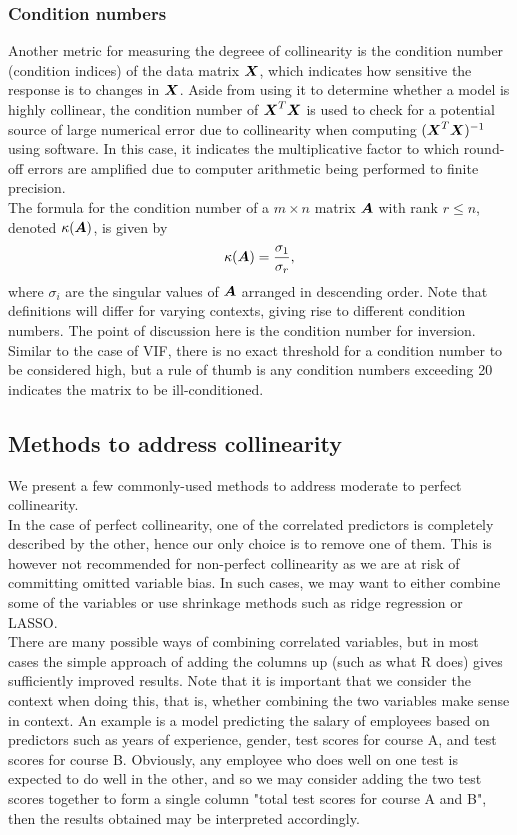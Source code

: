 \documentclass[12pt]{article}
\begin{document}
	\subsubsection{Condition numbers}
	Another metric for measuring the degreee of collinearity is the condition number (condition indices) of the data matrix $\boldsymbol{X}$, which indicates how sensitive the response is to changes in $\boldsymbol{X}$. Aside from using it to determine whether a model is highly collinear, the condition number of $\boldsymbol{X}^T\boldsymbol{X}$ is used to check for a potential source of large numerical error due to collinearity when computing $(\boldsymbol{X}^T\boldsymbol{X})^{-1}$ using software. In this case, it indicates the multiplicative factor to which round-off errors are amplified due to computer arithmetic being performed to finite precision.\\
	
	The formula for the condition number of a $m\times n$ matrix $\boldsymbol{A}$ with rank $r\leq n$, denoted $\kappa(\boldsymbol{A})$, is given by
	$$\kappa(\boldsymbol{A})=\frac{\sigma_1}{\sigma_r},$$
	where $\sigma_i$ are the singular values of $\boldsymbol{A}$ arranged in descending order. Note that definitions will differ for varying contexts, giving rise to different condition numbers. The point of discussion here is the condition number for inversion.\\
	
	Similar to the case of VIF, there is no exact threshold for a condition number to be considered high, but a rule of thumb is any condition numbers exceeding 20 indicates the matrix to be ill-conditioned. 
	
	\subsection{Methods to address collinearity}
	
	We present a few commonly-used methods to address moderate to perfect collinearity. \\
	
	In the case of perfect collinearity, one of the correlated predictors is completely described by the other, hence our only choice is to remove one of them. This is however not recommended for non-perfect collinearity as we are at risk of committing omitted variable bias. In such cases, we may want to either combine some of the variables or use shrinkage methods such as ridge regression or LASSO.\\
	
	There are many possible ways of combining correlated variables, but in most cases the simple approach of adding the columns up (such as what R does) gives sufficiently improved results. Note that it is important that we consider the context when doing this, that is, whether combining the two variables make sense in context. An example is a model predicting the salary of employees based on predictors such as years of experience, gender, test scores for course A, and test scores for course B. Obviously, any employee who does well on one test is expected to do well in the other, and so we may consider adding the two test scores together to form a single column "total test scores for course A and B", then the results obtained may be interpreted accordingly.\\
	
\end{document}
